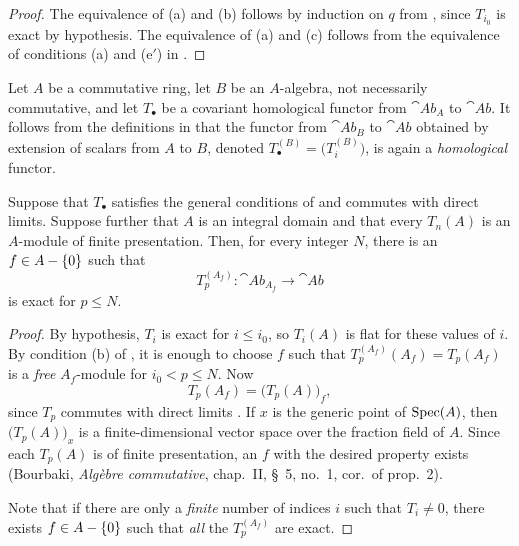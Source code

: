 \begin{proof}
The equivalence of (a) and (b) follows by induction on $q$ from
, since $T_{i_0}$ is exact by hypothesis.  The
equivalence of (a) and (c) follows from the equivalence of
conditions (a) and ($\mathrm{e}'$) in .
\end{proof}


\begin{env}[7.3.8]
\label{III.7.3.8}
Let $A$ be a commutative ring, let $B$ be an $A$-algebra, not
necessarily commutative, and let $T_\bullet$ be a covariant
homological functor from $\cat{Ab}_A$ to $\cat{Ab}$.  It
follows from the definitions in  that the
functor from $\cat{Ab}_B$ to $\cat{Ab}$ obtained by extension
of scalars from $A$ to $B$, denoted $T_\bullet^{(B)}=\bigl(T_i^{(B)}\bigr)$,
is again a \emph{homological} functor.
\end{env}

\begin{corollary}[7.3.9]
\label{III.7.3.9}
Suppose that $T_\bullet$ satisfies the general conditions of
 and commutes with direct limits.  Suppose
further that $A$ is an integral domain and that every $T_n(A)$
is an $A$-module of finite presentation.  Then, for every
integer $N$, there is an $f\in A-\{0\}$ such that
\[
  T_p^{(A_f)}:\cat{Ab}_{A_f}\longrightarrow\cat{Ab}
\]
is exact for $p\leq N$.
\end{corollary}

\begin{proof}
By hypothesis, $T_i$ is exact for $i\leq i_0$, so $T_i(A)$ is
flat for these values of $i$.  By condition (b) of
, it is enough to choose $f$ such that $T_p^{(A_f)}(A_f)=T_p(A_f)$
is a \emph{free} $A_f$-module for $i_0<p\leq N$.  Now
\[
  T_p(A_f)=\bigl(T_p(A)\bigr)_f,
\]
since $T_p$ commutes with direct limits .  If
$x$ is the generic point of $\operatorname{Spec}(A)$, then
$\bigl(T_p(A)\bigr)_x$ is a finite-dimensional vector space
over the fraction field of $A$.  Since each $T_p(A)$ is of
finite presentation, an $f$ with the desired property exists
(Bourbaki, \emph{Alg\`ebre commutative}, chap.~II, \S~5,
no.~1, cor.\ of prop.~2).

Note that if there are only a \emph{finite} number of indices $i$
such that $T_i\neq0$, there exists $f\in A-\{0\}$ such that
\emph{all} the $T_p^{(A_f)}$ are exact.
\end{proof}

